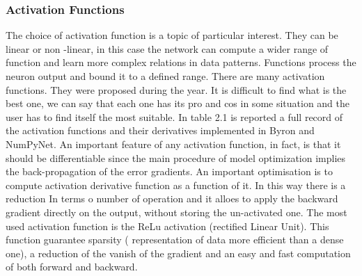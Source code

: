 \documentclass[a4paper, 10pt]{book}
\begin{document}
\subsubsection{Activation Functions}
The choice of activation function is a topic of particular interest. They can be linear or non -linear, in this case the network can compute a wider range of function and learn more complex relations in data patterns. Functions process the neuron output and bound it to a defined range.
There are many activation functions. They were proposed during the year. It is difficult to find what is the best one, we can say that each one has its pro and cos in some situation and the user has to find itself the most suitable.
In table 2.1 is reported a full record of the activation functions and their derivatives implemented in Byron and NumPyNet. 
An important feature of any activation function, in fact, is that it should be differentiable
since the main procedure of model optimization implies the back-propagation of the error
gradients.
An important optimisation is to compute activation derivative function as a function of it. In this way there is a reduction In terms o number of operation and it alloes to apply the backward gradient directly on the output, without storing the un-activated one.
The most used activation function is the ReLu activation (rectified Linear Unit). This function guarantee sparsity ( representation of data more efficient than a dense one), a reduction of the vanish of the gradient and an easy and fast computation of both forward and backward.
\end{document}
